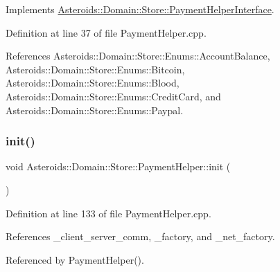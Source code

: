 Implements \hyperlink{classAsteroids_1_1Domain_1_1Store_1_1PaymentHelperInterface_adad811502d567c3f77636c4117998a0e}{Asteroids\+::\+Domain\+::\+Store\+::\+Payment\+Helper\+Interface}.



Definition at line 37 of file Payment\+Helper.\+cpp.



References Asteroids\+::\+Domain\+::\+Store\+::\+Enums\+::\+Account\+Balance, Asteroids\+::\+Domain\+::\+Store\+::\+Enums\+::\+Bitcoin, Asteroids\+::\+Domain\+::\+Store\+::\+Enums\+::\+Blood, Asteroids\+::\+Domain\+::\+Store\+::\+Enums\+::\+Credit\+Card, and Asteroids\+::\+Domain\+::\+Store\+::\+Enums\+::\+Paypal.

\mbox{\label{classAsteroids_1_1Domain_1_1Store_1_1PaymentHelper_afc5b560df53ca599a801c77e48f511f2}} 
\subsubsection{\texorpdfstring{init()}{init()}}
{\footnotesize\ttfamily void Asteroids\+::\+Domain\+::\+Store\+::\+Payment\+Helper\+::init (\begin{DoxyParamCaption}{ }\end{DoxyParamCaption})\hspace{0.3cm}{\ttfamily [private]}}



Definition at line 133 of file Payment\+Helper.\+cpp.



References \+\_\+client\+\_\+server\+\_\+comm, \+\_\+factory, and \+\_\+net\+\_\+factory.



Referenced by Payment\+Helper().

